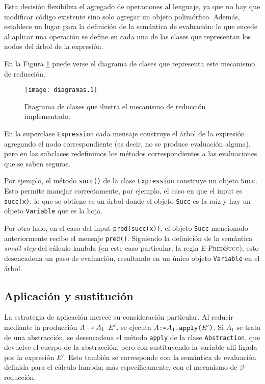 \documentclass[11pt]{article}
\begin{document}
Esta decisión flexibiliza el agregado de operaciones al lenguaje, ya que no hay que modificar código existente sino solo agregar un objeto polimórfico. Además, establece un lugar para la definición de la semántica de evaluación: lo que sucede al aplicar una operación se define en cada una de las clases que representan los nodos del árbol de la expresión.

En la Figura \ref{fig:diagrama-clases} puede verse el diagrama de clases que representa este mecanismo de reducción.

\begin{figure}[h] \centering
\texttt{[image: diagramas.1]}
\caption{Diagrama de clases que ilustra el mecanismo de reducción
	implementado.}
\label{fig:diagrama-clases}
\end{figure}

En la superclase \lstinline|Expression| cada mensaje construye el árbol de la expresión agregando el nodo correspondiente (es decir, no se produce evaluación alguna), pero en las subclases redefinimos los métodos correspondientes a las evaluaciones que se saben seguras. 

Por ejemplo, el método \lstinline|succ()| de la clase \lstinline|Expression| construye un objeto \lstinline|Succ|. Esto permite manejar correctamente, por ejemplo, el caso en que el input es \verb|succ(x)|: lo que se obtiene es un árbol donde el objeto \lstinline|Succ| es la raíz y hay un objeto \lstinline|Variable| que es la hoja.

Por otro lado, en el caso del input \verb|pred(succ(x))|, el objeto
\lstinline|Succ| mencionado anteriormente recibe el mensaje
\lstinline|pred()|. Siguiendo la definición de la semántica
\emph{small-step} del cálculo lambda (en este caso particular, la regla
\textsc{E-PredSucc}), esto desencadena un paso de evaluación, resultando en
un único objeto \lstinline|Variable| en el árbol.

\subsection{Aplicación y sustitución}

La estrategia de aplicación merece su consideración particular. Al reducir mediante la producción $A \rightarrow A_1 \verb| | E'$, se ejecuta $A \verb|:=| A_1\verb|.apply(|E'\verb|)|$. Si $A_1$ se trata de una abstracción, se desencadena el método \lstinline|apply| de la clase \lstinline|Abstraction|, que devuelve el cuerpo de la abstracción, pero con sustituyendo la variable allí ligada por la expresión $E'$. Esto también se corresponde con la semántica de evaluación definida para el cálculo lambda; más específicamente, con el mecanismo de $\beta$-reducción.
\end{document}
